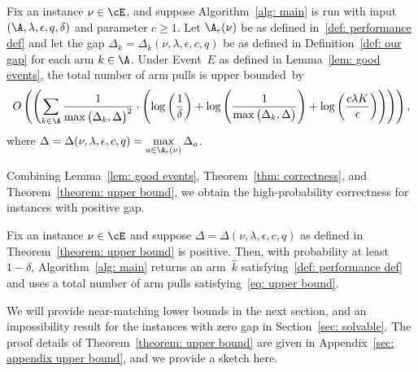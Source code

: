 \begin{theorem}
\label{theorem: upper bound}
   Fix an instance $\nu \in \cE$, and suppose Algorithm~\ref{alg: main} is run with input $(\A, \lambda, \epsilon, q, \delta)$ and parameter $c \ge 1$.
    Let $\A_{\epsilon}(\nu) $ be as defined in~\eqref{def: performance def} and let the gap $\Delta_{k} = \Delta_{k}(\nu, \lambda, \epsilon, c, q)$ be as defined in Definition~\ref{def: our gap} for each arm $k \in \A$.
    Under Event~$E$ as defined in Lemma~\ref{lem: good events},
    the total number of arm pulls is upper bounded~by    
    \begin{equation}
    \label{eq: upper bound}
        O
        \left(
        \left(
        \sum_{ k \in \A }
        \dfrac{1}{ \max\big( \Delta_{k},  \Delta  \big)^2} \cdot 
        \left( 
         \log \left(\frac{1}{ \delta } \right) +
         \log \left(\frac{1}{ \max\big( \Delta_{k},  \Delta  \big)}\right) +
         \log \left(\frac{c \lambda K}{ \epsilon } \right)    
        \right)
        \right)
        \right),
    \end{equation}
    where $\Delta  =  \Delta(\nu, \lambda, \epsilon, c, q) = \max\limits_{a \in \A_{\epsilon}(\nu)} \Delta_{a}$.
\end{theorem}


Combining Lemma~\ref{lem: good events}, Theorem~\ref{thm: correctness}, and Theorem~\ref{theorem: upper bound}, we obtain
the high-probability correctness for instances with positive gap.
\begin{corollary}
\label{cor: combined guarantee}
    Fix an instance $\nu \in \cE$ and suppose
    $\Delta =  \Delta(\nu, \lambda, \epsilon, c, q) $ as defined in Theorem~\ref{theorem: upper bound} is positive. Then, with probability at least $1-\delta$, Algorithm~\ref{alg: main} returns an arm~$\hat{k}$ satisfying~\eqref{def: performance def} and uses a total number of arm pulls satisfying~\eqref{eq: upper bound}.
\end{corollary}

We will provide near-matching lower bounds in the next section, and an impossibility result for the instances with zero gap in Section~\ref{sec: solvable}. The proof details of Theorem~\ref{theorem: upper bound} are given in Appendix~\ref{sec: appendix upper bound}, and we provide a sketch here.


